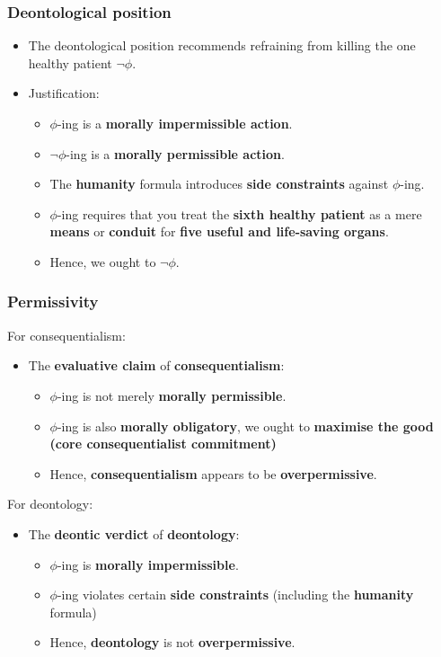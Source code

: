 \documentclass[11pt]{article}
\begin{document}
 \newpage
\subsubsection{Deontological position}
\label{sec:org9c5907a}
\begin{itemize}
\item The deontological position recommends refraining from killing the one healthy patient \(\neg \phi\).
\item Justification:
\begin{itemize}
\item \(\phi\)-ing is a \textbf{morally impermissible action}.
\item \(\neg \phi\)-ing is a \textbf{morally permissible action}.
\item The \textbf{humanity} formula introduces \textbf{side constraints} against \(\phi\)-ing.
\item \(\phi\)-ing requires that you treat the \textbf{sixth healthy patient} as a mere \textbf{means} or \textbf{conduit} for \textbf{five useful and life-saving organs}.
\item Hence, we ought to \(\neg \phi\).
\end{itemize}
\end{itemize}
\subsubsection{Permissivity}
\label{sec:org05c5286}
For consequentialism:
\begin{itemize}
\item The \textbf{evaluative claim} of \textbf{consequentialism}:
\begin{itemize}
\item \(\phi\)-ing is not merely \textbf{morally permissible}.
\item \(\phi\)-ing is also \textbf{morally obligatory}, we ought to \textbf{maximise the good (core consequentialist commitment)}
\item Hence, \textbf{consequentialism} appears to be \textbf{overpermissive}.
\end{itemize}
\end{itemize}

For deontology:
\begin{itemize}
\item The \textbf{deontic verdict} of \textbf{deontology}:
\begin{itemize}
\item \(\phi\)-ing is \textbf{morally impermissible}.
\item \(\phi\)-ing violates certain \textbf{side constraints} (including the \textbf{humanity} formula)
\item Hence, \textbf{deontology} is not \textbf{overpermissive}.
\end{itemize}
\end{itemize}
\end{document}
